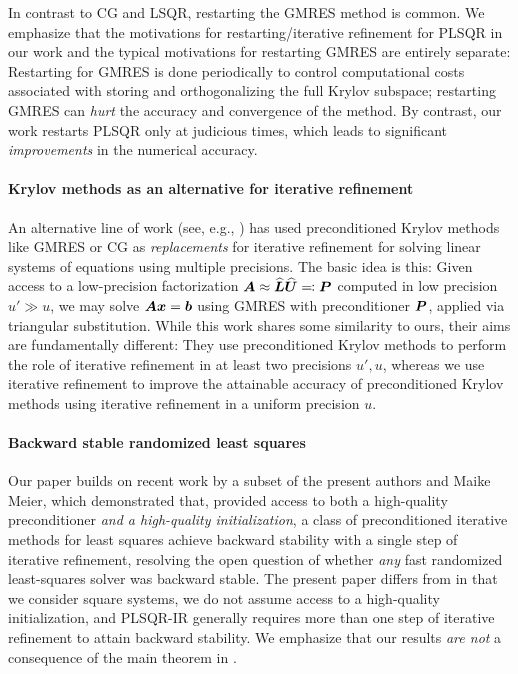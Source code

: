 \documentclass[onefignum,onetabnum,pagebackref,dvipsnames]{siamart220329}
\begin{document}
In contrast to CG and LSQR, restarting the GMRES method is common.
We emphasize that the motivations for restarting/iterative refinement for PLSQR in our work and the typical motivations for restarting GMRES are entirely separate: Restarting for GMRES is done periodically to control computational costs associated with storing and orthogonalizing the full Krylov subspace; restarting GMRES can \emph{hurt} the accuracy and convergence of the method.
By contrast, our work restarts PLSQR only at judicious times, which leads to significant \emph{improvements} in the numerical accuracy. 

\paragraph{Krylov methods as an alternative for iterative refinement}
An alternative line of work (see, e.g., \cite{amestoy2024five,carson2018accelerating,HP21,CH17}) has used preconditioned Krylov methods like GMRES or CG as \emph{replacements} for iterative refinement for solving linear systems of equations using multiple precisions.
The basic idea is this:
Given access to a low-precision \LU factorization $\boldsymbol{A} \approx \boldsymbol{\widehat{L}}\boldsymbol{\widehat{U}} \eqqcolon \boldsymbol{P}$ computed in low precision $u' \gg u$, we may solve $\boldsymbol{A}\boldsymbol{x} = \boldsymbol{b}$ using GMRES with preconditioner $\boldsymbol{P}$, applied via triangular substitution.
While this work shares some similarity to ours, their aims are fundamentally different: They use preconditioned Krylov methods to perform the role of iterative refinement in at least two precisions $u', u$, whereas we use iterative refinement to improve the attainable accuracy of preconditioned Krylov methods using iterative refinement in a uniform precision $u$.

\paragraph{Backward stable randomized least squares}
Our paper builds on recent work \cite{EMN24} by a subset of the present authors and Maike Meier, which demonstrated that, provided access to both a high-quality preconditioner \emph{and a high-quality initialization}, a class of preconditioned iterative methods for least squares achieve backward stability with a single step of iterative refinement, resolving the open question \cite{Epp24a,MNTW24} of whether \emph{any} fast randomized least-squares solver was backward stable.
The present paper differs from \cite{EMN24} in that we consider square systems, we do not assume access to a high-quality initialization, and PLSQR-IR generally requires more than one step of iterative refinement to attain backward stability.
We emphasize that our results \emph{are not} a consequence of the main theorem in \cite{EMN24}.
\end{document}
